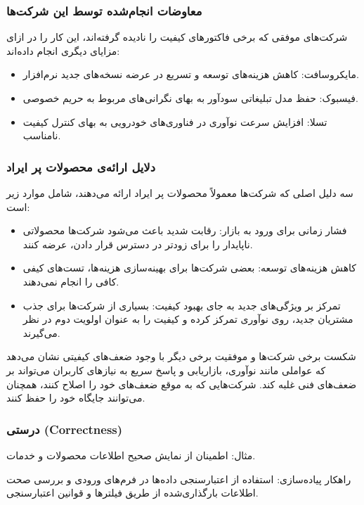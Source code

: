 \subsubsection*{معاوضات انجام‌شده توسط این شرکت‌ها}
شرکت‌های موفقی که برخی فاکتورهای کیفیت را نادیده گرفته‌اند، این کار را در ازای مزایای دیگری انجام داده‌اند:
\begin{itemize}
    \item {مایکروسافت:} کاهش هزینه‌های توسعه و تسریع در عرضه نسخه‌های جدید نرم‌افزار.
    \item {فیسبوک:} حفظ مدل تبلیغاتی سودآور به بهای نگرانی‌های مربوط به حریم خصوصی.
    \item {تسلا:} افزایش سرعت نوآوری در فناوری‌های خودرویی به بهای کنترل کیفیت نامناسب.
\end{itemize}

\subsubsection*{دلایل ارائه‌ی محصولات پر ایراد}
سه دلیل اصلی که شرکت‌ها معمولاً محصولات پر ایراد ارائه می‌دهند، شامل موارد زیر است:
\begin{itemize}
    \item {فشار زمانی برای ورود به بازار:} رقابت شدید باعث می‌شود شرکت‌ها محصولاتی ناپایدار را برای زودتر در دسترس قرار دادن، عرضه کنند.
    \item {کاهش هزینه‌های توسعه:} بعضی شرکت‌ها برای بهینه‌سازی هزینه‌ها، تست‌های کیفی کافی را انجام نمی‌دهند.
    \item {تمرکز بر ویژگی‌های جدید به جای بهبود کیفیت:} بسیاری از شرکت‌ها برای جذب مشتریان جدید، روی نوآوری تمرکز کرده و کیفیت را به عنوان اولویت دوم در نظر می‌گیرند.
\end{itemize}

شکست برخی شرکت‌ها و موفقیت برخی دیگر با وجود ضعف‌های کیفیتی نشان می‌دهد که عواملی مانند نوآوری، بازاریابی و پاسخ سریع به نیازهای کاربران می‌تواند بر ضعف‌های فنی غلبه کند. شرکت‌هایی که به موقع ضعف‌های خود را اصلاح کنند، همچنان می‌توانند جایگاه خود را حفظ کنند.




\subsubsection*{درستی (Correctness)}
{مثال:} اطمینان از نمایش صحیح اطلاعات محصولات و خدمات.

{راهکار پیاده‌سازی:} استفاده از اعتبارسنجی داده‌ها در فرم‌های ورودی و بررسی صحت اطلاعات بارگذاری‌شده از طریق فیلترها و قوانین اعتبارسنجی.

